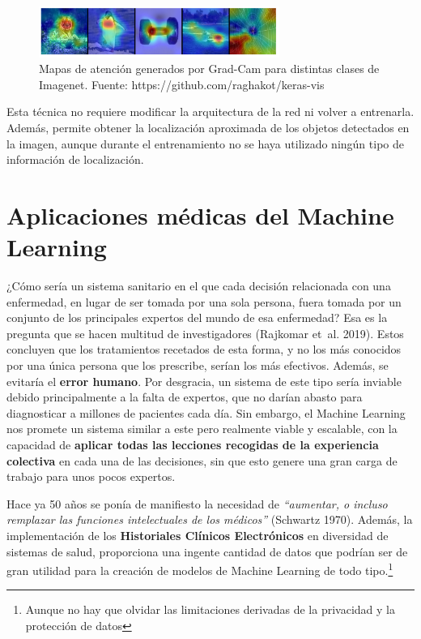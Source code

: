 \documentclass[
  12pt,
  spanish,
  a4paperpaper,
]{report}
\begin{document}
\begin{figure}
\centering
\includegraphics[width=0.7\textwidth,height=\textheight]{source/figures/grad-cam.png}
\caption{Mapas de atención generados por Grad-Cam para distintas clases
de Imagenet. Fuente: https://github.com/raghakot/keras-vis
\label{gradcam}}
\end{figure}

Esta técnica no requiere modificar la arquitectura de la red ni volver a
entrenarla. Además, permite obtener la localización aproximada de los
objetos detectados en la imagen, aunque durante el entrenamiento no se
haya utilizado ningún tipo de información de localización.

\hypertarget{aplicaciones-muxe9dicas-del-machine-learning}{%
\section{Aplicaciones médicas del Machine
Learning}\label{aplicaciones-muxe9dicas-del-machine-learning}}

¿Cómo sería un sistema sanitario en el que cada decisión relacionada con
una enfermedad, en lugar de ser tomada por una sola persona, fuera
tomada por un conjunto de los principales expertos del mundo de esa
enfermedad? Esa es la pregunta que se hacen multitud de investigadores
(Rajkomar et~al. 2019). Estos concluyen que los tratamientos recetados
de esta forma, y no los más conocidos por una única persona que los
prescribe, serían los más efectivos. Además, se evitaría el
\textbf{error humano}. Por desgracia, un sistema de este tipo sería
inviable debido principalmente a la falta de expertos, que no darían
abasto para diagnosticar a millones de pacientes cada día. Sin embargo,
el Machine Learning nos promete un sistema similar a este pero realmente
viable y escalable, con la capacidad de \textbf{aplicar todas las
lecciones recogidas de la experiencia colectiva} en cada una de las
decisiones, sin que esto genere una gran carga de trabajo para unos
pocos expertos.

Hace ya 50 años se ponía de manifiesto la necesidad de \emph{``aumentar,
o incluso remplazar las funciones intelectuales de los médicos''}
(Schwartz 1970). Además, la implementación de los \textbf{Historiales
Clínicos Electrónicos} en diversidad de sistemas de salud, proporciona
una ingente cantidad de datos que podrían ser de gran utilidad para la
creación de modelos de Machine Learning de todo tipo.\footnote{Aunque no
  hay que olvidar las limitaciones derivadas de la privacidad y la
  protección de datos}
\end{document}
